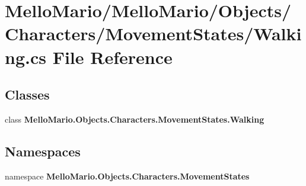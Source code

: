 \section{Mello\+Mario/\+Mello\+Mario/\+Objects/\+Characters/\+Movement\+States/\+Walking.cs File Reference}
\label{Walking_8cs}
\subsection*{Classes}
\begin{DoxyCompactItemize}
\item 
class \textbf{ Mello\+Mario.\+Objects.\+Characters.\+Movement\+States.\+Walking}
\end{DoxyCompactItemize}
\subsection*{Namespaces}
\begin{DoxyCompactItemize}
\item 
namespace \textbf{ Mello\+Mario.\+Objects.\+Characters.\+Movement\+States}
\end{DoxyCompactItemize}
